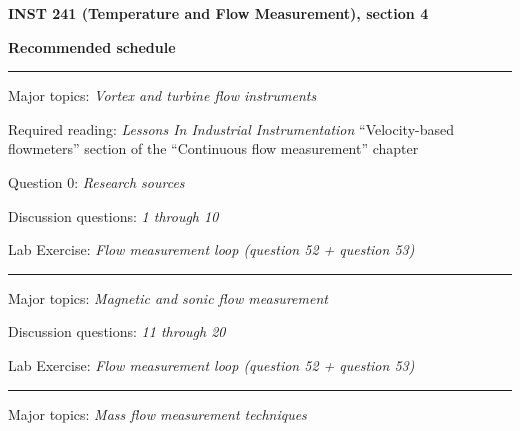 
\centerline{\bf INST 241 (Temperature and Flow Measurement), section 4} \bigskip 
 
\vskip 10pt

\noindent
{\bf Recommended schedule}

\vskip 5pt

\hrule \vskip 5pt
\noindent
{}

\hskip 10pt Major topics: {\it Vortex and turbine flow instruments}
 
\hskip 10pt Required reading: {\it Lessons In Industrial Instrumentation} ``Velocity-based flowmeters'' section of the ``Continuous flow measurement'' chapter
 
\hskip 10pt Question 0: {\it Research sources}

\hskip 10pt Discussion questions: {\it 1 through 10}
 
\hskip 10pt Lab Exercise: {\it Flow measurement loop (question 52 + question 53)}





\vskip 10pt
\hrule \vskip 5pt
\noindent
{}

\hskip 10pt Major topics: {\it Magnetic and sonic flow measurement}
 
\hskip 10pt Discussion questions: {\it 11 through 20}
 
\hskip 10pt Lab Exercise: {\it Flow measurement loop (question 52 + question 53)}
 



\vskip 10pt
\hrule \vskip 5pt
\noindent
{}

\hskip 10pt Major topics: {\it Mass flow measurement techniques}
 
